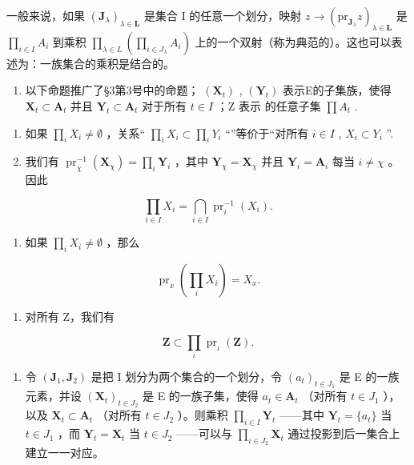 一般来说，如果 \((\mathbf{J}_{\lambda})_{\lambda \in \mathbf{L}}\) 是集合 I 的任意一个划分，映射 \(z \to (\mathrm{pr}_{\mathbf{J}_{\lambda}} z)_{\lambda \in \mathbf{L}}\) 是 \(\prod_{i \in I} A_i\) 到乘积 \(\prod_{\lambda \in L} \left( \prod_{i \in J_{\lambda}} A_i \right)\) 上的一个双射（称为典范的）。这也可以表述为：一族集合的乘积是结合的。

\begin{enumerate}
\def\labelenumi{\arabic{enumi}.}
\setcounter{enumi}{11}
\tightlist
\item
  以下命题推广了§3第3号中的命题； \((\mathbf{X}_t)\) , \((\mathbf{Y}_t)\) 表示E的子集族，使得 \(\mathbf{X}_t \subset \mathbf{A}_t\) 并且 \(\mathbf{Y}_t \subset \mathbf{A}_t\) 对于所有 \(t \in I\) ；Z 表示 的任意子集 \(\prod A_t\) .
\end{enumerate}

\begin{enumerate}
\def\labelenumi{(\alph{enumi})}
\item
  如果 \(\prod_{i} X_{i} \neq \emptyset\) ，关系“ \(\prod_{i} X_{i} \subset \prod_{i} Y_{i}\) “”等价于“对所有 \(i \in I\) , \(X_{i} \subset Y_{i}\) ''.
\item
  我们有 \(\operatorname{pr}_{\chi}^{-1}(\mathbf{X}_{\chi}) = \prod_{i} \mathbf{Y}_{i}\) ，其中 \(\mathbf{Y}_{\chi} = \mathbf{X}_{\chi}\) 并且 \(\mathbf{Y}_{i} = \mathbf{A}_{i}\) 每当 \(i \neq \chi\) 。因此
\end{enumerate}

\[
\prod_ {i \in I} X _ {i} = \bigcap_ {i \in I} \operatorname{pr}_{i}^{-1}(X _ {i}).\tag{47}
\]

\begin{enumerate}
\def\labelenumi{(\alph{enumi})}
\setcounter{enumi}{2}
\tightlist
\item
  如果 \(\prod_{i} X_i \neq \emptyset\) ，那么
\end{enumerate}

\[
\operatorname{pr} _ {x} \left(\prod_ {i} X _ {i}\right) = X _ {x}.\tag{48}
\]

\begin{enumerate}
\def\labelenumi{(\alph{enumi})}
\setcounter{enumi}{3}
\tightlist
\item
  对所有 Z，我们有
\end{enumerate}

\[
\mathbf {Z} \subset \prod_ {\iota} \operatorname{pr} _ {\iota} (\mathbf {Z}).\tag{49}
\]

\begin{enumerate}
\def\labelenumi{(\alph{enumi})}
\setcounter{enumi}{4}
\tightlist
\item
  令 \((\mathbf{J}_1, \mathbf{J}_2)\) 是把 I 划分为两个集合的一个划分，令 \((a_t)_{t \in J_1}\) 是 E 的一族元素，并设 \((\mathbf{X}_t)_{t \in J_2}\) 是 E 的一族子集，使得 \(a_t \in \mathbf{A}_t\) （对所有 \(t \in J_1\) ），以及 \(\mathbf{X}_t \subset \mathbf{A}_t\) （对所有 \(t \in J_2\) ）。则乘积 \(\prod_{i \in I} \mathbf{Y}_t\) ——其中 \(\mathbf{Y}_t = \{a_t\}\) 当 \(t \in J_1\) ，而 \(\mathbf{Y}_t = \mathbf{X}_t\) 当 \(t \in J_2\) ——可以与 \(\prod_{i \in J_2} \mathbf{X}_t\) 通过投影到后一集合上建立一一对应。
\end{enumerate}

